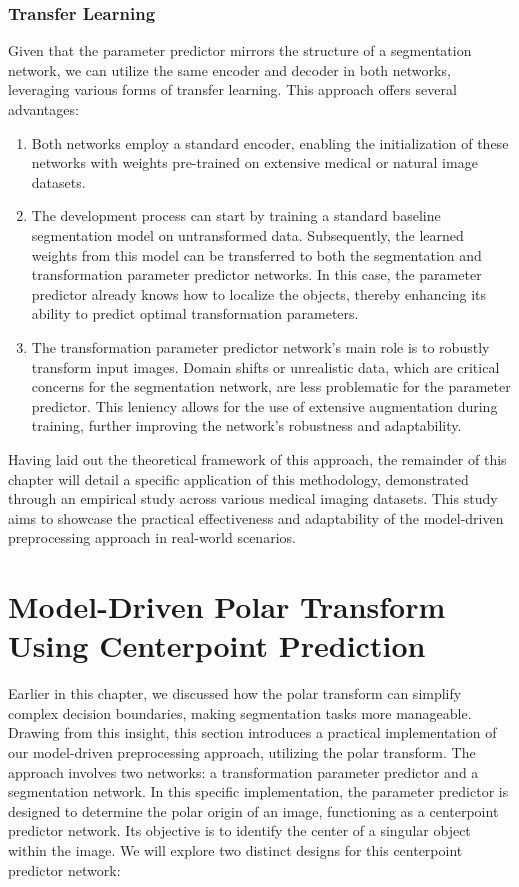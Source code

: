 \subsubsection{Transfer Learning}

Given that the parameter predictor mirrors the structure of a segmentation network, we can utilize the same encoder and decoder in both networks, leveraging various forms of transfer learning. This approach offers several advantages:

\begin{enumerate}
	\item Both networks employ a standard encoder, enabling the initialization of these networks with weights pre-trained on extensive medical or natural image datasets.
	\item The development process can start by training a standard baseline segmentation model on untransformed data. Subsequently, the learned weights from this model can be transferred to both the segmentation and transformation parameter predictor networks. In this case, the parameter predictor already knows how to localize the objects, thereby enhancing its ability to predict optimal transformation parameters.
	\item The transformation parameter predictor network's main role is to robustly transform input images. Domain shifts or unrealistic data, which are critical concerns for the segmentation network, are less problematic for the parameter predictor. This leniency allows for the use of extensive augmentation during training, further improving the network's robustness and adaptability.
\end{enumerate}

Having laid out the theoretical framework of this approach, the remainder of this chapter will detail a specific application of this methodology, demonstrated through an empirical study across various medical imaging datasets. This study aims to showcase the practical effectiveness and adaptability of the model-driven preprocessing approach in real-world scenarios.

\section{Model-Driven Polar Transform Using Centerpoint Prediction}
\label{polar-paper}

Earlier in this chapter, we discussed how the polar transform can simplify complex decision boundaries, making segmentation tasks more manageable. Drawing from this insight, this section introduces a practical implementation of our model-driven preprocessing approach, utilizing the polar transform. The approach involves two networks: a transformation parameter predictor and a segmentation network. In this specific implementation, the parameter predictor is designed to determine the polar origin of an image, functioning as a centerpoint predictor network. Its objective is to identify the center of a singular object within the image. We will explore two distinct designs for this centerpoint predictor network:

